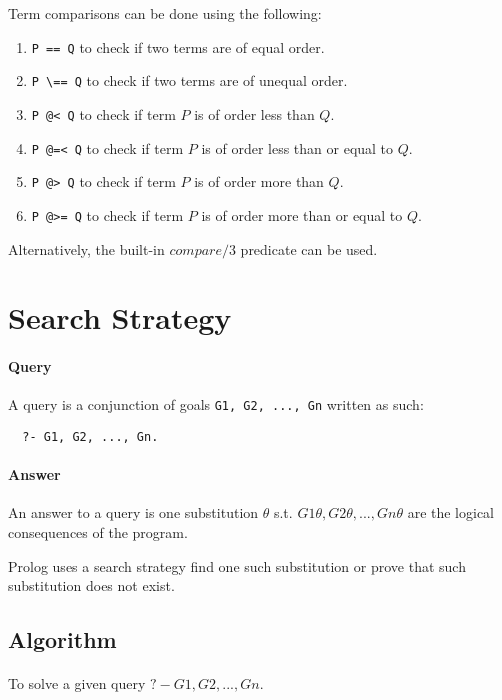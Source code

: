 \documentclass{article}
\begin{document}
\begin{multicols}{2}
  Term comparisons can be done using the following:
  
  \begin{enumerate}
  \item \lstinline{P == Q} to check if two terms are of equal order.
  \item \lstinline{P \== Q} to check if two terms are of unequal order.
  \item \lstinline{P @< Q} to check if term $P$ is of order less than $Q$.
  \item \lstinline{P @=< Q} to check if term $P$ is of order less than or equal to $Q$.
  \item \lstinline{P @> Q} to check if term $P$ is of order more than $Q$.
  \item \lstinline{P @>= Q} to check if term $P$ is of order more than or equal to $Q$.
  \end{enumerate}
  
  Alternatively, the built-in $compare/3$ predicate can be used.
  
  \section{Search Strategy}
  
  \paragraph{Query} A query is a conjunction of goals \lstinline{G1, G2, ..., Gn} written as such:
  
  \begin{lstlisting}
  ?- G1, G2, ..., Gn.
  \end{lstlisting}
  
  \paragraph{Answer} An answer to a query is one substitution $\theta$ s.t. $G1\theta, G2\theta, ..., Gn\theta$ are the logical consequences of the program.
  
  Prolog uses a search strategy find one such substitution or prove that such substitution does not exist.
  
  \subsection{Algorithm}
  
  \paragraph{} To solve a given query $?- G1, G2, ..., Gn.$
  

\end{multicols}
\end{document}
